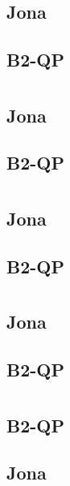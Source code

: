 \documentclass{article}
\begin{document}
\section{}
\subsection*{Jona}


\subsection*{B2-QP}


\section{}
\subsection*{Jona}


\subsection*{B2-QP}


\section{}
\subsection*{Jona}


\subsection*{B2-QP}


\section{}
\subsection*{Jona}


\subsection*{B2-QP}


\section{}
\subsection*{B2-QP}


\subsection*{Jona}
%
\end{document}
